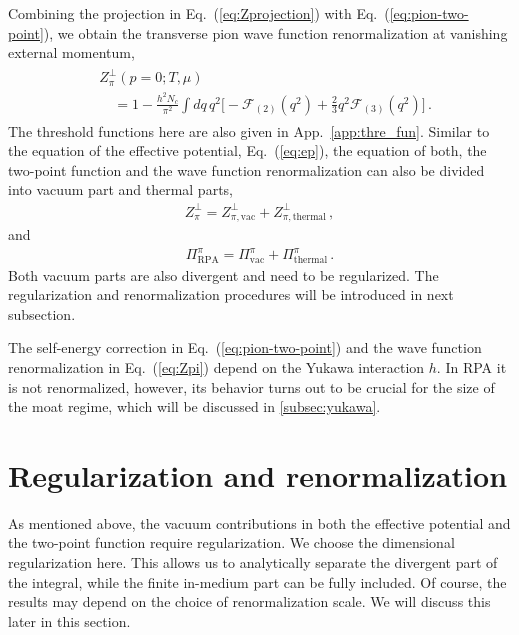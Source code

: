 \documentclass[reprint,english,superscriptaddress,preprintnumbers,amsmath,amssymb,aps,prd]{revtex4-2}
\def\Eq#1{Eq.~(\ref{#1})}
\def\App#1{App.~\ref{#1}}
\begin{document}
Combining the projection in \Eq{eq:Zprojection} with \Eq{eq:pion-two-point}, we obtain the transverse pion wave function renormalization at vanishing external momentum,
%
\begin{align}
\begin{split}
&Z^\perp_\pi(p=0;T,\mu)\\[2ex]
&\quad =1-\frac{h^2N_c}{\pi^2}\int dq\,q^2\Big[-\mathcal{F}_{(2)}(q^2)+\frac{2}{3}q^2\mathcal{F}_{(3)}(q^2)\Big]
\,.\label{eq:Zpi}
\end{split}
\end{align}
%
The threshold functions here are also given in \App{app:thre_fun}. Similar to the equation of the effective potential, \Eq{eq:ep}, the equation of both, the two-point function and the wave function renormalization can also be divided into vacuum part and thermal parts,
%
\begin{align}
Z^\perp_\pi=Z^\perp_{\pi,\mathrm{vac}}+Z^\perp_{\pi,\mathrm{thermal}}\,,
\label{eq:Z_v_t}
\end{align}
%
and
%
\begin{align}
\Pi^\pi_\mathrm{RPA}=\Pi^\pi_\mathrm{vac}+\Pi^\pi_\mathrm{thermal}\,.
\label{eq:sigma_v_t}
\end{align}
%
Both vacuum parts are also divergent and need to be regularized. The regularization and renormalization procedures will be introduced in next subsection.

The self-energy correction in \Eq{eq:pion-two-point} and the wave function renormalization in \Eq{eq:Zpi} depend on the Yukawa interaction $h$. In RPA it is not renormalized, however, its behavior turns out to be crucial for the size of the moat regime, which will be discussed in \ref{subsec:yukawa}.

\section{Regularization and renormalization}\label{sec:regularization}
%

As mentioned above, the vacuum contributions in both the effective potential and the two-point function require regularization. We choose the dimensional regularization here. This allows us to analytically separate the divergent part of the integral, while the finite in-medium part can be fully included. Of course, the results may depend on the choice of renormalization scale. We will discuss this later in this section.
\end{document}
